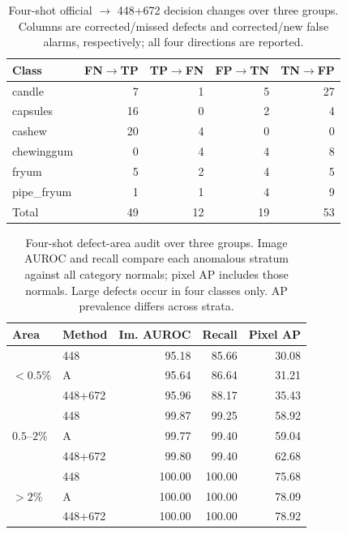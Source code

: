 \documentclass[times,10pt,twocolumn,letterpaper]{article}
\begin{document}
\begin{table}[t]
\centering
\caption{Four-shot official $\rightarrow$ 448+672 decision changes over three groups. Columns are corrected/missed defects and corrected/new false alarms, respectively; all four directions are reported.}
\label{tab:scale_transitions}
\scriptsize
\setlength{\tabcolsep}{3pt}
\begin{tabular}{lrrrr}
\toprule
Class & FN$\to$TP & TP$\to$FN & FP$\to$TN & TN$\to$FP\\
\midrule
candle & 7 & 1 & 5 & 27\\
capsules & 16 & 0 & 2 & 4\\
cashew & 20 & 4 & 0 & 0\\
chewinggum & 0 & 4 & 4 & 8\\
fryum & 5 & 2 & 4 & 5\\
pipe\_fryum & 1 & 1 & 4 & 9\\
\midrule
Total & 49 & 12 & 19 & 53\\
\bottomrule
\end{tabular}
\end{table}

\begin{table}[t]
\centering
\caption{Four-shot defect-area audit over three groups. Image AUROC and recall compare each anomalous stratum against all category normals; pixel AP includes those normals. Large defects occur in four classes only. AP prevalence differs across strata.}
\label{tab:size_strata}
\scriptsize
\setlength{\tabcolsep}{3pt}
\begin{tabular}{llrrr}
\toprule
Area & Method & Im. AUROC & Recall & Pixel AP\\
\midrule
\multirow{3}{*}{$<0.5\%$} & 448 & 95.18 & 85.66 & 30.08\\
 & A & 95.64 & 86.64 & 31.21\\
 & 448+672 & 95.96 & 88.17 & 35.43\\
\multirow{3}{*}{$0.5$--$2\%$} & 448 & 99.87 & 99.25 & 58.92\\
 & A & 99.77 & 99.40 & 59.04\\
 & 448+672 & 99.80 & 99.40 & 62.68\\
\multirow{3}{*}{$>2\%$} & 448 & 100.00 & 100.00 & 75.68\\
 & A & 100.00 & 100.00 & 78.09\\
 & 448+672 & 100.00 & 100.00 & 78.92\\
\bottomrule
\end{tabular}
\end{table}
\end{document}
